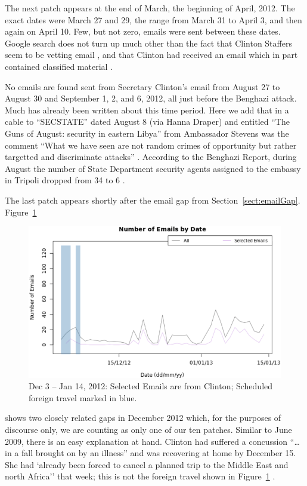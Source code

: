 \documentclass[journal]{vgtc}                %
\begin{document}
The next patch appears at the end of March, the beginning of April, 2012.  The exact dates were March 27 and 29, the range from March 31 to April 3, and then again on April 10.   Few, but not zero, emails were sent between these dates.  Google search does not turn up much other than the fact that Clinton Staffers seem to be vetting email \cite{tightReinRecords, staffVetEmail}, and that Clinton had received an email which in part contained classified material \cite{classifiedInPart}.

No emails are found sent from Secretary Clinton's email from August 27 to August 30 and September 1, 2, and 6, 2012, all just before the Benghazi attack.  Much has already been written about this time period.  Here we add that in a cable to ``SECSTATE'' dated August 8 (via Hanna Draper) and entitled ``The Guns of August: security in eastern Libya'' from Ambassador Stevens was the comment ``What we have seen are not random crimes of opportunity but rather targetted and discriminate attacks'' \cite{gunsOfAugust}.  According to the Benghazi Report,  during August the number of State Department security agents assigned to the embassy in Tripoli dropped from 34 to 6 \cite{BenghaziReport}.

The last patch appears shortly after the email gap from Section~\ref{sect:emailGap}.  Figure~\ref{fig:ZeroEmailsDec2012}
\begin{figure}[h]
\begin{center}
\includegraphics[width=0.95\linewidth]{ZeroEmailsDec2012}
\caption{Dec 3 -- Jan 14, 2012:  Selected Emails are from Clinton; Scheduled foreign travel marked in blue.}
\label{fig:ZeroEmailsDec2012}
\end{center}
\end{figure}
shows two closely related gaps in December 2012 which, for the purposes of discourse only,  we are counting as only one of our ten patches.  Similar to June 2009, there is an easy explanation at hand.  Clinton had suffered a concussion ``\ldots in a fall brought on by an illness'' \cite{concussion} and was recovering at home by December 15.  She had `already been forced to cancel a planned trip to the Middle East and north Africa'' \cite{concussion} that week; this is not the foreign travel shown in Figure~\ref{fig:ZeroEmailsDec2012} \cite{ForeignSched}.  
\end{document}
